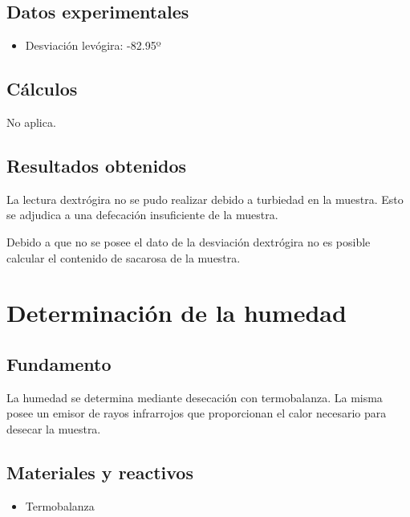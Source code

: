 \documentclass[a4paper,12pt]{article} %
\begin{document}
\subsection{Datos experimentales}

\begin{itemize}
    \item Desviación levógira: -82.95º
\end{itemize}


\subsection{Cálculos}
No aplica.
\subsection{Resultados obtenidos}
La lectura dextrógira no se pudo realizar debido a turbiedad en la muestra. Esto se adjudica a una defecación insuficiente de la muestra.

Debido a que no se posee el dato de la desviación dextrógira no es posible calcular el contenido de sacarosa de la muestra.

\section{Determinación de la humedad}
\subsection{Fundamento}
La humedad se determina mediante desecación con termobalanza. La misma posee un emisor de rayos infrarrojos que proporcionan el calor necesario para desecar la muestra.
\subsection{Materiales y reactivos}
\begin{itemize}
    \item Termobalanza
\end{itemize}
\end{document}
